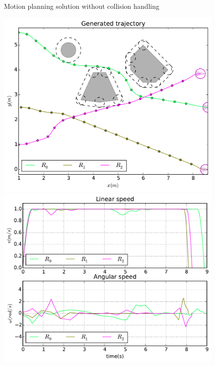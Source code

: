 \documentclass[eprint]{actapoly}
\begin{document}
\begin{figure}[!h]
  \caption{Motion planning solution without collision handling\label{fig:collision}}
\label{fig:res}
\end{figure}

\begin{figure}\centering
  \includegraphics[width=\linewidth]{./images/no_collision/multirobot-path2.pdf} 
  \\[1mm]
  \includegraphics[width=\linewidth]{./images/no_collision/multirobot-vw2.pdf} %

\end{figure}
\end{document}

